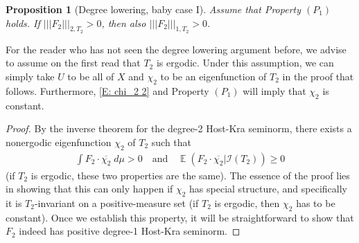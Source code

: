 \documentclass[11pt]{amsart}
\newtheorem{proposition}[lemma]{Proposition}
\theoremstyle{definition}
\DeclareMathOperator*{\E}{\mathbb{E}}
\newcommand{\CI}{{\mathcal I}}
\newcommand{\nnorm}[1]{\lvert\!|\!| #1|\!|\!\rvert}
\newcommand{\1}{{\mathbf{1}}}
\begin{document}
\begin{proposition}[Degree lowering, baby case I]\label{P: degree lowering s=2}
    Assume %
    that Property $(P_1)$ holds. If $\nnorm{F_2}_{2, T_2}>0$, then also $\nnorm{F_2}_{1, T_2}>0$. 
\end{proposition}
For the reader who has not seen the degree lowering argument before, we advise to assume on the first read that $T_2$ is ergodic. Under this assumption, we can simply take $U$ to be all of $X$ and $\chi_2$ to be an eigenfunction of $T_2$ in the proof that follows. Furthermore, \eqref{E: chi_2 2} and Property $(P_1)$ will imply that $\chi_2$ is constant.
\begin{proof}
    By the inverse theorem for the degree-2 Host-Kra seminorm, there exists a nonergodic eigenfunction $\chi_2$ of $T_2$ such that 
    \begin{align}\label{E: positivity s=2}
        \int F_2 \cdot \overline{\chi_2}\; d\mu > 0\quad \textrm{and} \quad \E(F_2\cdot \overline{\chi_2}|\CI(T_2))\geq 0
    \end{align}
    (if $T_2$ is ergodic, these two properties are the same).
    The essence of the proof lies in showing that this can only happen if $\chi_2$ has special structure, and specifically it is $T_2$-invariant on a positive-measure set (if $T_2$ is ergodic, then $\chi_2$ has to be constant). Once we establish this property, it will be straightforward to show that $F_2$ indeed has positive degree-1 Host-Kra seminorm.
    

\end{proof}
\end{document}
